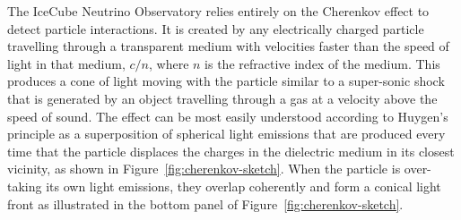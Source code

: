 The IceCube Neutrino Observatory relies entirely on the Cherenkov effect to detect particle interactions. It is created by any electrically charged particle travelling through a transparent medium with velocities faster than the speed of light in that medium, $c/n$, where $n$ is the refractive index of the medium. This produces a cone of light moving with the particle similar to a super-sonic shock that is generated by an object travelling through a gas at a velocity above the speed of sound. The effect can be most easily understood according to Huygen's principle as a superposition of spherical light emissions that are produced every time that the particle displaces the charges in the dielectric medium in its closest vicinity, as shown in Figure~\ref{fig:cherenkov-sketch}. When the particle is over-taking its own light emissions, they overlap coherently and form a conical light front as illustrated in the bottom panel of Figure~\ref{fig:cherenkov-sketch}.
